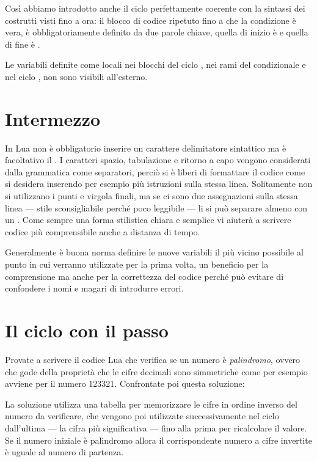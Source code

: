 Così abbiamo introdotto anche il ciclo 
perfettamente coerente con la sintassi dei costrutti visti fino a ora: il blocco
di codice ripetuto fino a che la condizione è vera, è obbligatoriamente definito
da due parole chiave, quella di inizio è  e quella di fine è .

Le variabili definite come locali nei blocchi del ciclo , nei rami del
condizionale  e nel ciclo , non sono visibili all'esterno.


\section{Intermezzo}

In Lua non è obbligatorio inserire un carattere delimitatore sintattico ma è
facoltativo il \key{;}. I caratteri spazio, tabulazione e ritorno a capo vengono
considerati dalla grammatica come separatori, perciò si è liberi di formattare
il codice come si desidera inserendo per esempio più istruzioni sulla stessa
linea. Solitamente non si utilizzano i punti e virgola finali, ma se ci sono due
assegnazioni sulla stessa linea --- stile sconsigliabile perché poco leggibile
--- li si può separare almeno con un \key{;}. Come sempre una forma stilistica
chiara e semplice vi aiuterà a scrivere codice più comprensibile anche a
distanza di tempo.

Generalmente è buona norma definire le nuove variabili il più vicino possibile
al punto in cui verranno utilizzate per la prima volta, un beneficio per la
comprensione ma anche per la correttezza del codice perché può evitare di
confondere i nomi e magari di introdurre errori.


\section{Il ciclo  con il passo}

Provate a scrivere il codice Lua che verifica se un numero è \emph{palindromo},
ovvero che gode della proprietà che le cifre decimali sono simmetriche come per
esempio avviene per il numero 123321. Confrontate poi questa soluzione:

La soluzione utilizza una tabella per memorizzare le cifre in ordine inverso del
numero da verificare, che vengono poi utilizzate successivamente nel ciclo
 dall'ultima --- la cifra più significativa --- fino alla
prima per ricalcolare il valore. Se il numero iniziale è palindromo allora il
corrispondente numero a cifre invertite è uguale al numero di partenza.

